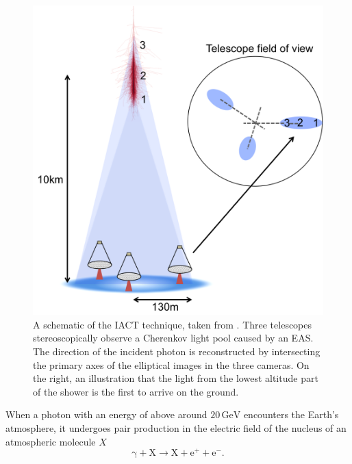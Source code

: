 \begin{figure}[ht] 
        \centering \includegraphics[width=0.7\columnwidth]{figures/schematic.png}

        \caption{
                \label{fig:schem} %
                A schematic of the IACT technique, taken from \cite{jamieiact}. Three telescopes stereoscopically observe a
                Cherenkov light pool caused by an EAS. The direction of the incident photon is reconstructed by intersecting the primary axes of 				 the elliptical images in the three cameras. On the right, an illustration that the light from the lowest altitude part of the shower is the first to arrive on the ground.
        }
\end{figure}
When a photon with an energy of above around $\mathrm{20\,GeV}$ encounters the Earth's atmosphere, it undergoes pair production in the electric field of the nucleus of an atmospheric molecule $X$
\begin{equation}
\mathrm{\gamma}+\mathrm{X} \rightarrow \mathrm{X}+\mathrm{e^+}+ \mathrm{e^-}.
\end{equation}
